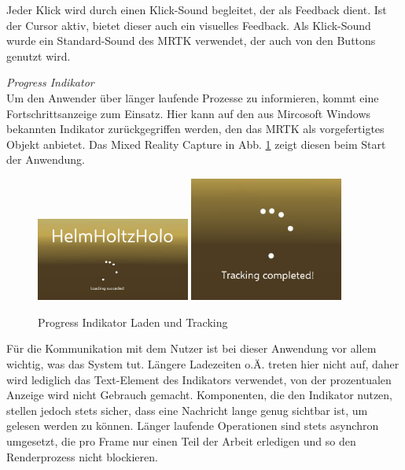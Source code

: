 Jeder Klick wird durch einen Klick-Sound begleitet, der als Feedback dient. Ist der Cursor aktiv, bietet dieser auch ein visuelles Feedback. Als Klick-Sound wurde ein Standard-Sound des MRTK verwendet, der auch von den Buttons genutzt wird.

\textit{Progress Indikator}\\
Um den Anwender über länger laufende Prozesse zu informieren, kommt eine Fortschrittsanzeige zum Einsatz. Hier kann auf den aus Mircosoft Windows bekannten Indikator zurückgegriffen werden, den das MRTK als vorgefertigtes Objekt anbietet. Das Mixed Reality Capture in Abb. \ref{img:pi-and-tracking} zeigt diesen beim Start der Anwendung.\\

\begin{figure}[H]
	\centering
	\includegraphics[width=0.45\textwidth]{images/loading.jpg}
	\hspace{0.05cm}	
	\includegraphics[width=0.45\textwidth]{images/tracking.jpg}
	\caption{Progress Indikator Laden und Tracking}
	\label{img:pi-and-tracking}
\end{figure}

Für die Kommunikation mit dem Nutzer ist bei dieser Anwendung vor allem wichtig, was das System tut. Längere Ladezeiten o.Ä. treten hier nicht auf, daher wird lediglich das Text-Element des Indikators verwendet, von der prozentualen Anzeige wird nicht Gebrauch gemacht. Komponenten, die den Indikator nutzen, stellen jedoch stets sicher, dass eine Nachricht lange genug sichtbar ist, um gelesen werden zu können. Länger laufende Operationen sind stets asynchron umgesetzt, die pro Frame nur einen Teil der Arbeit erledigen und so den Renderprozess nicht blockieren.\\

